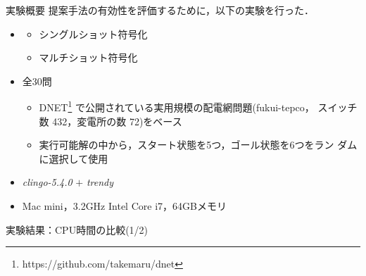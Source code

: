 \documentclass[dvipdfmx,11pt]{beamer}
\begin{document}
\begin{frame}{実験概要}
  \renewcommand{\thefootnote}{\fnsymbol{footnote}}
  \setcounter{footnote}{1}
  提案手法の有効性を評価するために，以下の実験を行った．
  \vfill
  \begin{itemize}
  \item {}
    \begin{itemize}
    \item シングルショット符号化
    \item マルチショット符号化
    \end{itemize}
  \item {} 全30問
    \begin{itemize}
    \item DNET\footnote{https://github.com/takemaru/dnet}
      で公開されている実用規模の配電網問題(\textsf{fukui-tepco}，
      スイッチ数 432，変電所の数 72)をベース
    \item 実行可能解の中から，スタート状態を5つ，ゴール状態を6つをラン
      ダムに選択して使用
    \end{itemize}
  \item {} \textit{clingo-5.4.0} $+$ \textit{trendy}
  \item {} Mac mini，3.2GHz Intel Core i7，64GBメモリ
  \end{itemize}
\end{frame}
\begin{frame}{実験結果：CPU時間の比較(1/2)}
 \centering
 \scalebox{0.8}{}
\end{frame}
\end{document}
